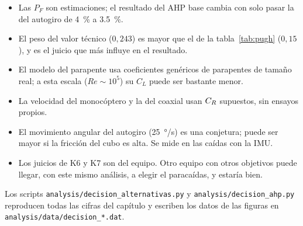 \begin{nota}
\begin{itemize}
  \item Las $P_F$ son estimaciones; el resultado del AHP base cambia con solo pasar la
        del autogiro de \SI{4}{\percent} a \SI{3.5}{\percent}.
  \item El peso del valor técnico ($0{,}243$) es mayor que el de la tabla~\ref{tab:pugh}
        ($0{,}15$), y es el juicio que más influye en el resultado.
  \item El modelo del parapente usa coeficientes genéricos de parapentes de tamaño
        real; a esta escala ($Re\sim10^5$) su $C_L$ puede ser bastante menor.
  \item La velocidad del monocóptero y la del coaxial usan $C_{R}$ supuestos, sin
        ensayos propios.
  \item El movimiento angular del autogiro (\SI{25}{\degree/s}) es una conjetura; puede ser
        mayor si la fricción del cubo es alta. Se mide en las caídas con la IMU.
  \item Los juicios de K6 y K7 son del equipo. Otro equipo con otros objetivos puede
        llegar, con este mismo análisis, a elegir el paracaídas, y estaría bien.
\end{itemize}
\end{nota}

Los scripts \texttt{analysis/decision\_alternativas.py} y
\texttt{analysis/decision\_ahp.py} reproducen todas las cifras del capítulo y escriben
los datos de las figuras en \texttt{analysis/data/decision\_*.dat}.
